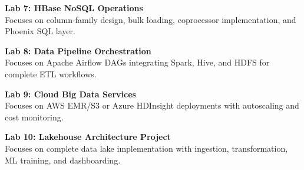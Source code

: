\vspace{0.2cm}

\noindent\textbf{Lab 7: HBase NoSQL Operations} \\
Focuses on column-family design, bulk loading, coprocessor implementation, and Phoenix SQL layer.

\vspace{0.2cm}

\noindent\textbf{Lab 8: Data Pipeline Orchestration} \\
Focuses on Apache Airflow DAGs integrating Spark, Hive, and HDFS for complete ETL workflows.

\vspace{0.2cm}

\noindent\textbf{Lab 9: Cloud Big Data Services} \\
Focuses on AWS EMR/S3 or Azure HDInsight deployments with autoscaling and cost monitoring.

\vspace{0.2cm}

\noindent\textbf{Lab 10: Lakehouse Architecture Project} \\
Focuses on complete data lake implementation with ingestion, transformation, ML training, and dashboarding.

\vspace{0.2cm}

\newpage
{}
